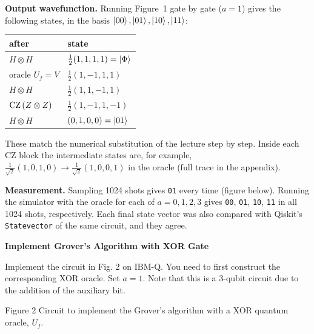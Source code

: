 \documentclass[a4paper, 10pt]{article}
\begin{document}
\begin{solution}
	\noindent \textbf{Output wavefunction.} Running Figure~1 gate by gate (\( a = 1 \)) gives the following states, in the basis \( \ket{00}, \ket{01}, \ket{10}, \ket{11} \):
	\begin{center}
		\begin{tabular}{ll}
			\toprule
			after                                & state                                       \\
			\midrule
			\( H \otimes H \)                    & \( \tfrac{1}{2}(1, 1, 1, 1) = \ket{\Phi} \) \\
			oracle \( U_f = V \)                 & \( \tfrac{1}{2}(1, -1, 1, 1) \)             \\
			\( H \otimes H \)                    & \( \tfrac{1}{2}(1, 1, -1, 1) \)             \\
			\( \mathrm{CZ}\left(Z \otimes Z\right) \) & \( \tfrac{1}{2}(1, -1, 1, -1) \)            \\
			\( H \otimes H \)                    & \( (0, 1, 0, 0) = \ket{01} \)               \\
			\bottomrule
		\end{tabular}
	\end{center}
	These match the numerical substitution of the lecture step by step. Inside each CZ block the intermediate states are, for example, \( \tfrac{1}{\sqrt{2}}(1, 0, 1, 0) \to \tfrac{1}{\sqrt{2}}(1, 0, 0, 1) \) in the oracle (full trace in the appendix).

	\myspace

	\noindent \textbf{Measurement.} Sampling 1024 shots gives \texttt{01} every time (figure below). Running the simulator with the oracle for each of \( a = 0, 1, 2, 3 \) gives \texttt{00}, \texttt{01}, \texttt{10}, \texttt{11} in all 1024 shots, respectively.
	Each final state vector was also compared with Qiskit's \texttt{Statevector} of the same circuit, and they agree.
\end{solution}

\begin{problem}
\textbf{Implement Grover's Algorithm with XOR Gate}
\par Implement the circuit in Fig. 2 on IBM-Q.
You need to first construct the corresponding XOR oracle. Set \( a = 1 \).
Note that this is a 3-qubit circuit due to the addition of the auxiliary bit.


\begin{center}
	{
		\footnotesize Figure 2 Circuit to implement the Grover's algorithm with a XOR quantum oracle, \( U_f \).
	}
\end{center}
\end{problem}
\end{document}
